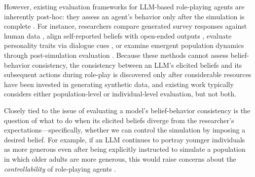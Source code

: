 \documentclass{article} %
\begin{document}
However, existing evaluation frameworks for LLM-based role-playing agents are inherently post-hoc: they assess an agent’s behavior only after the simulation is complete \citep{argyle2023out, huang2024social, wang2023incharacter, Bhandari2025CanLA, hou2025can}. For instance, researchers compare generated survey responses against human data \citep{argyle2023out}, align self-reported beliefs with open-ended outputs \citep{huang2024social}, evaluate personality traits via dialogue cues \citep{wang2023incharacter, Bhandari2025CanLA}, or examine emergent population dynamics through post-simulation evaluation \citep{hou2025can}. Because these methods cannot assess belief-behavior consistency, the consistency between an LLM’s elicited beliefs and its subsequent actions during role-play is discovered only after considerable resources have been invested in generating synthetic data, and existing work typically considers either population-level or individual-level evaluation, but not both.


Closely tied to the issue of evaluating a model's belief-behavior consistency is the question of what to do when its elicited beliefs diverge from the researcher's expectations—specifically, whether we can control the simulation by imposing a desired belief. For example, if an LLM continues to portray younger individuals as more generous even after being explicitly instructed to simulate a population in which older adults are more generous, this would raise concerns about the \textit{controllability} of role-playing agents \citep{shen2025mind, mannekote2025can}.


\end{document}
